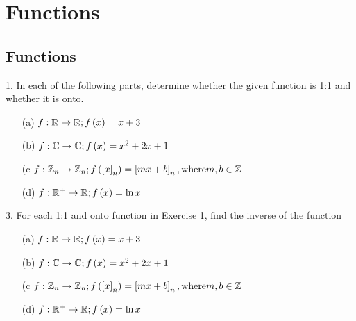 
\section{Functions}  
\subsection{Functions}
\begin{mdframed}[style=darkQuesion]
  1.   In each of the following parts, determine whether the given function is 1:1
  and whether it is onto. 
\begin{itemize}
  \item [(a)]{
    $f:\mathbb{R}\to \mathbb{R}; f\left(x\right)=x+3$
  }
  \item [(b)]{
    $f:\mathbb{C}\to \mathbb{C}; f\left(x\right)=x^2+2x+1$
  }
  \item [(c]{
    $f:\mathbb{Z}_n\to \mathbb{Z}_n; f\left(\left[x\right]_n\right)=\left[mx+b\right]_n, \text{where} m,b\in \mathbb{Z}$
  }
  \item [(d)]{
    $f:\mathbb{R}^+\to \mathbb{R}; f\left(x\right)=\ln x$
  }
\end{itemize}
\end{mdframed}

\begin{mdframed}[style=darkAnswer,frametitle={Joe Starr}]

\end{mdframed}
  \newpage
\begin{mdframed}[style=darkQuesion]
  3.   For each 1:1 and onto function in Exercise 1, find the inverse of the 
  function
\begin{itemize}
  \item [(a)]{
    $f:\mathbb{R}\to \mathbb{R}; f\left(x\right)=x+3$
  }
  \item [(b)]{
    $f:\mathbb{C}\to \mathbb{C}; f\left(x\right)=x^2+2x+1$
  }
  \item [(c]{
    $f:\mathbb{Z}_n\to \mathbb{Z}_n; f\left(\left[x\right]_n\right)=\left[mx+b\right]_n, \text{where} m,b\in \mathbb{Z}$
  }
  \item [(d)]{
    $f:\mathbb{R}^+\to \mathbb{R}; f\left(x\right)=\ln x$
  }
\end{itemize}
\end{mdframed}

